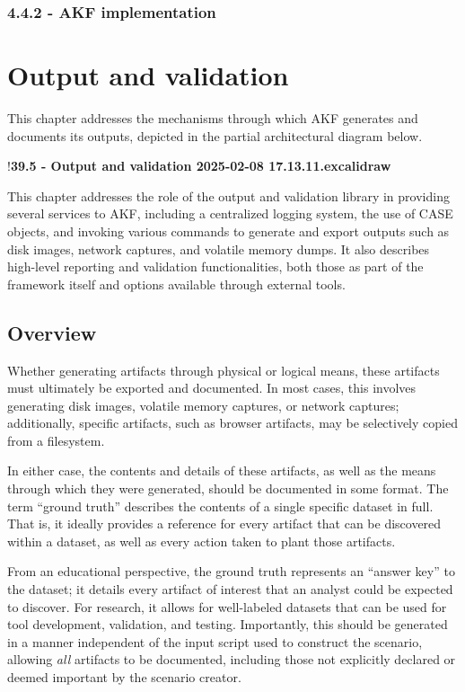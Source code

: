 \documentclass[letterpaper,12pt]{report}
\begin{document}
\subsection*{4.4.2 - AKF implementation}\label{akf-implementation}

\chapter{Output and validation}\label{chapter-five}

This chapter addresses the mechanisms through which AKF generates and
documents its outputs, depicted in the partial architectural diagram
below.

!\textbf{39.5 - Output and validation 2025-02-08 17.13.11.excalidraw}

This chapter addresses the role of the output and validation library in
providing several services to AKF, including a centralized logging
system, the use of CASE objects, and invoking various commands to
generate and export outputs such as disk images, network captures, and
volatile memory dumps. It also describes high-level reporting and
validation functionalities, both those as part of the framework itself
and options available through external tools.

\section{Overview}\label{overview}

Whether generating artifacts through physical or logical means, these
artifacts must ultimately be exported and documented. In most cases,
this involves generating disk images, volatile memory captures, or
network captures; additionally, specific artifacts, such as browser
artifacts, may be selectively copied from a filesystem.

In either case, the contents and details of these artifacts, as well as
the means through which they were generated, should be documented in
some format. The term ``ground truth'' describes the contents of a
single specific dataset in full. That is, it ideally provides a
reference for every artifact that can be discovered within a dataset, as
well as every action taken to plant those artifacts.

From an educational perspective, the ground truth represents an ``answer
key'' to the dataset; it details every artifact of interest that an
analyst could be expected to discover. For research, it allows for
well-labeled datasets that can be used for tool development, validation,
and testing. Importantly, this should be generated in a manner
independent of the input script used to construct the scenario, allowing
\emph{all} artifacts to be documented, including those not explicitly
declared or deemed important by the scenario creator.
\end{document}
